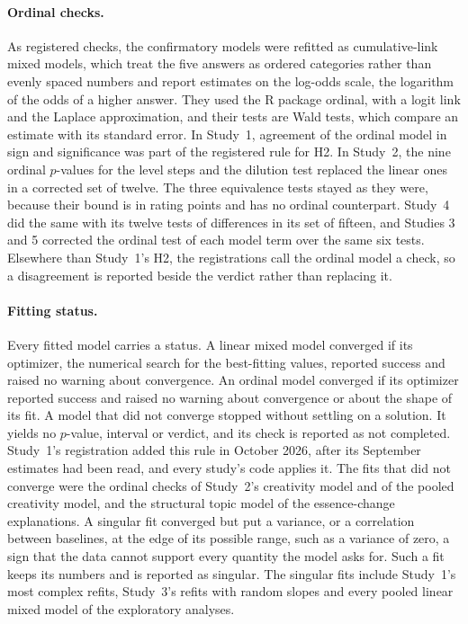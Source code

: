 \paragraph*{Ordinal checks.}
As registered checks, the confirmatory models were refitted as cumulative-link mixed models, which treat the five answers as ordered categories rather than evenly spaced numbers and report estimates on the log-odds scale, the logarithm of the odds of a higher answer. They used the R package ordinal, with a logit link and the Laplace approximation, and their tests are Wald tests, which compare an estimate with its standard error. In Study~1, agreement of the ordinal model in sign and significance was part of the registered rule for H2. In Study~2, the nine ordinal $p$-values for the level steps and the dilution test replaced the linear ones in a corrected set of twelve. The three equivalence tests stayed as they were, because their bound is in rating points and has no ordinal counterpart. Study~4 did the same with its twelve tests of differences in its set of fifteen, and Studies 3 and 5 corrected the ordinal test of each model term over the same six tests. Elsewhere than Study~1's H2, the registrations call the ordinal model a check, so a disagreement is reported beside the verdict rather than replacing it.

\paragraph*{Fitting status.}
Every fitted model carries a status. A linear mixed model converged if its optimizer, the numerical search for the best-fitting values, reported success and raised no warning about convergence. An ordinal model converged if its optimizer reported success and raised no warning about convergence or about the shape of its fit. A model that did not converge stopped without settling on a solution. It yields no $p$-value, interval or verdict, and its check is reported as not completed. Study~1's registration added this rule in October 2026, after its September estimates had been read, and every study's code applies it. The fits that did not converge were the ordinal checks of Study~2's creativity model and of the pooled creativity model, and the structural topic model of the essence-change explanations. A singular fit converged but put a variance, or a correlation between baselines, at the edge of its possible range, such as a variance of zero, a sign that the data cannot support every quantity the model asks for. Such a fit keeps its numbers and is reported as singular. The singular fits include Study~1's most complex refits, Study~3's refits with random slopes and every pooled linear mixed model of the exploratory analyses.


